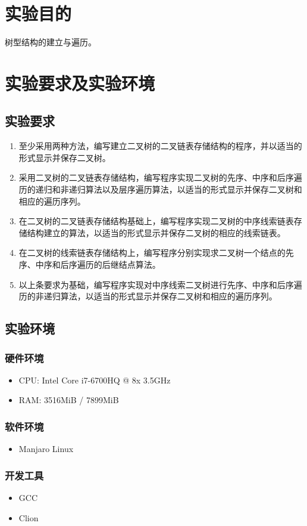 \section{实验目的}
树型结构的建立与遍历。

\section{实验要求及实验环境}
\subsection{实验要求}
\begin{enumerate}
    \item 至少采用两种方法，编写建立二叉树的二叉链表存储结构的程序，并以适当的形式显示并保存二叉树。
    \item 采用二叉树的二叉链表存储结构，编写程序实现二叉树的先序、中序和后序遍历的递归和非递归算法以及层序遍历算法，以适当的形式显示并保存二叉树和相应的遍历序列。
    \item 在二叉树的二叉链表存储结构基础上，编写程序实现二叉树的中序线索链表存储结构建立的算法，以适当的形式显示并保存二叉树的相应的线索链表。
    \item 在二叉树的线索链表存储结构上，编写程序分别实现求二叉树一个结点的先序、中序和后序遍历的后继结点算法。
    \item 以上条要求为基础，编写程序实现对中序线索二叉树进行先序、中序和后序遍历的非递归算法，以适当的形式显示并保存二叉树和相应的遍历序列。
\end{enumerate}

\subsection{实验环境}
\subsubsection{硬件环境}
\begin{itemize}
    \item CPU: Intel Core i7-6700HQ @ 8x 3.5GHz
    \item RAM: 3516MiB / 7899MiB
\end{itemize}

\subsubsection{软件环境}
\begin{itemize}
    \item Manjaro Linux
\end{itemize}

\subsubsection{开发工具}
\begin{itemize}
    \item GCC
    \item Clion
\end{itemize}